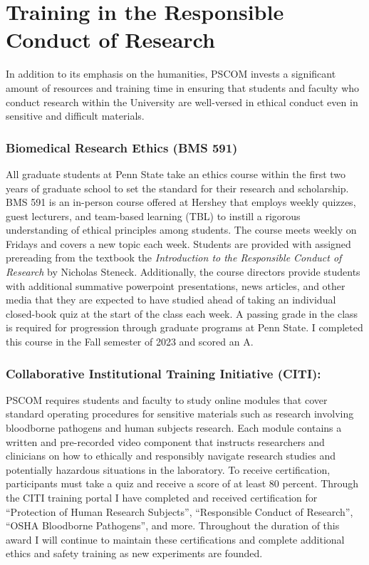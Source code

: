 \documentclass{NIHGrant}
\begin{document}
\part*{Training in the Responsible Conduct of Research}
In addition to its emphasis on the humanities, PSCOM invests a significant amount of resources and training time in ensuring that students and faculty who conduct research within the University are well-versed in ethical conduct even in sensitive and difficult materials.

\section*{Biomedical Research Ethics (BMS 591)}
All graduate students at Penn State take an ethics course within the first two years of graduate school to set the standard for their research and scholarship. BMS 591 is an in-person course offered at Hershey that employs weekly quizzes, guest lecturers, and team-based learning (TBL) to instill a rigorous understanding of ethical principles among students. The course meets weekly on Fridays and covers a new topic each week. Students are provided with assigned prereading from the textbook the \textit{Introduction to the Responsible Conduct of Research} by Nicholas Steneck. Additionally, the course directors provide students with additional summative powerpoint presentations, news articles, and other media that they are expected to have studied ahead of taking an individual closed-book quiz at the start of the class each week. A passing grade in the class is required for progression through graduate programs at Penn State. I completed this course in the Fall semester of 2023 and scored an A.

\section*{Collaborative Institutional Training Initiative (CITI):}
PSCOM requires students and faculty to study online modules that cover standard operating procedures for sensitive materials such as research involving bloodborne pathogens and human subjects research. Each module contains a written and pre-recorded video component that instructs researchers and clinicians on how to ethically and responsibly navigate research studies and potentially hazardous situations in the laboratory. To receive certification, participants must take a quiz and receive a score of at least 80 percent. Through the CITI training portal I have completed and received certification for ``Protection of Human Research Subjects'', ``Responsible Conduct of Research'', ``OSHA Bloodborne Pathogens'', and more. Throughout the duration of this award I will continue to maintain these certifications and complete additional ethics and safety training as new experiments are founded.
\end{document}
